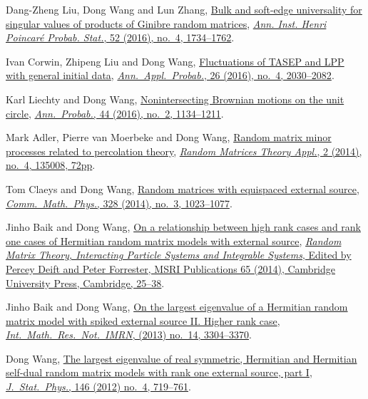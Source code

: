 \begin{etaremune}
\item
  Dang-Zheng Liu, Dong Wang and Lun Zhang, \href{http://arxiv.org/abs/1412.6777}{Bulk and soft-edge universality for singular values of products of Ginibre random matrices}, \href{https://doi.org/10.1214/15-AIHP696}{\textit{Ann. Inst. Henri Poincar\'e Probab. Stat.}, 52 (2016), no.\ 4, 1734--1762}.
\item
  Ivan Corwin, Zhipeng Liu and Dong Wang, \href{http://arxiv.org/abs/1412.5087}{Fluctuations of TASEP and LPP with general initial data}, \href{https://doi.org/10.1214/15-AAP1139}{\textit{Ann.\ Appl.\ Probab.}, 26 (2016), no.\ 4, 2030--2082}.
\item
  Karl Liechty and Dong Wang, \href{http://arxiv.org/abs/1312.7390}{Nonintersecting Brownian motions on the unit circle}, \href{https://doi.org/10.1214/14-AOP998}{\textit{Ann.\ Probab.}, 44 (2016), no.\ 2, 1134--1211}.
\item 
  Mark Adler, Pierre van Moerbeke and Dong Wang,
  \href{http://arxiv.org/abs/1301.7017}{Random matrix minor processes related to percolation theory}, \href{https://doi.org/10.1142/S2010326313500081}{\textit{Random Matrices Theory Appl.}, 2 (2014), no.\ 4, 135008, 72pp}.
\item 
  Tom Claeys and Dong Wang,
  \href{http://arxiv.org/abs/1212.3768}{Random matrices with equispaced external source}, \href{https://doi.org/10.1007/s00220-014-1988-y}{\textit{Comm.\ Math.\ Phys.}, 328 (2014), no.\ 3, 1023--1077}.
\item Jinho Baik and Dong Wang,
  \href{http://arxiv.org/abs/1207.0389}{On a relationship between high rank cases and rank one cases of Hermitian random matrix models with external source}, \href{http://www.cambridge.org/asia/catalogue/catalogue.asp?isbn=9781107079922}{\textit{Random Matrix Theory, Interacting Particle Systems and Integrable Systems}, Edited by Percey Deift and Peter Forrester, MSRI Publications 65 (2014), Cambridge University Press, Cambridge, 25--38}.
\item Jinho Baik and Dong Wang,
  \href{http://arxiv.org/abs/1104.2915}{On the largest eigenvalue of a Hermitian random matrix model with spiked external source II. Higher rank case}, \href{https://doi.org/10.1093/imrn/rns136}{\textit{Int.\ Math.\ Res.\ Not.\ IMRN}, (2013) no.\ 14, 3304--3370}.
\item Dong Wang,
  \href{http://arxiv.org/abs/1012.4144}{The largest eigenvalue of real symmetric, Hermitian and Hermitian self-dual random matrix models with rank one external source, part I}, \href{https://doi.org/10.1007/s10955-012-0417-x}{\textit{J.\ Stat.\ Phys.}, 146 (2012) no.\ 4, 719--761}.

\end{etaremune}
